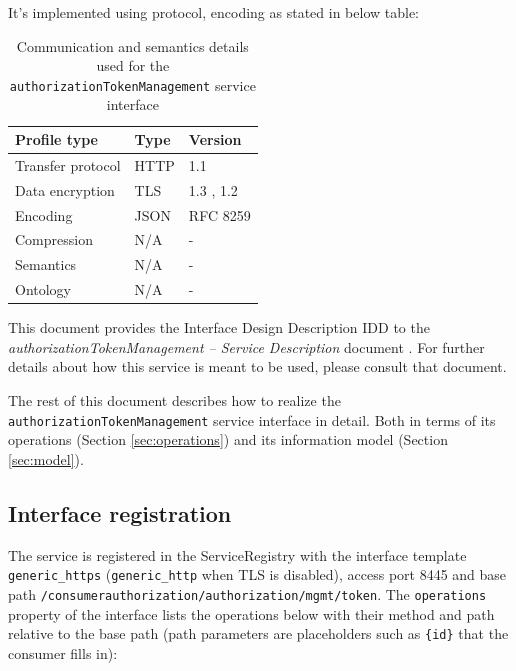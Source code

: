 \documentclass[a4paper]{arrowhead}
\begin{document}
It's implemented using protocol, encoding as stated in below table:
\begin{table}[ht!]
  \centering
  \begin{tabular}{|l|l|l|}
    \hline
    \rowcolor{gray!33} Profile type & Type & Version \\ \hline
    Transfer protocol & HTTP & 1.1 \cite{rfc9112} \\ \hline
    Data encryption & TLS & 1.3 \cite{rfc8446}, 1.2 \cite{rfc5246} \\ \hline
    Encoding & JSON & RFC 8259 \cite{rfc8259} \\ \hline
    Compression & N/A & - \\ \hline
    Semantics & N/A & - \\ \hline
    Ontology & N/A & - \\ \hline
  \end{tabular}
  \caption{Communication and semantics details used for the \texttt{authorization\allowbreak{}Token\allowbreak{}Management} service interface}
  \label{tab:comunication_semantics_profile}
\end{table}

This document provides the Interface Design Description IDD to the \textit{authorizationTokenManagement -- Service Description} document \cite{ca-authorizationTokenManagement-sd}.
For further details about how this service is meant to be used, please consult that document.

The rest of this document describes how to realize the \texttt{authorization\allowbreak{}Token\allowbreak{}Management} service
interface in detail. Both in terms of its operations (Section \ref{sec:operations}) and its information model (Section \ref{sec:model}).

\subsection{Interface registration}

The service is registered in the ServiceRegistry with the interface template \texttt{generic\_\allowbreak{}https} (\texttt{generic\_\allowbreak{}http} when TLS is disabled), access port 8445 and base path \texttt{/\allowbreak{}consumerauthorization/\allowbreak{}authorization/\allowbreak{}mgmt/\allowbreak{}token}. The \texttt{operations} property of the interface lists the operations below with their method and path relative to the base path (path parameters are placeholders such as \texttt{\{id\}} that the consumer fills in):
\end{document}
